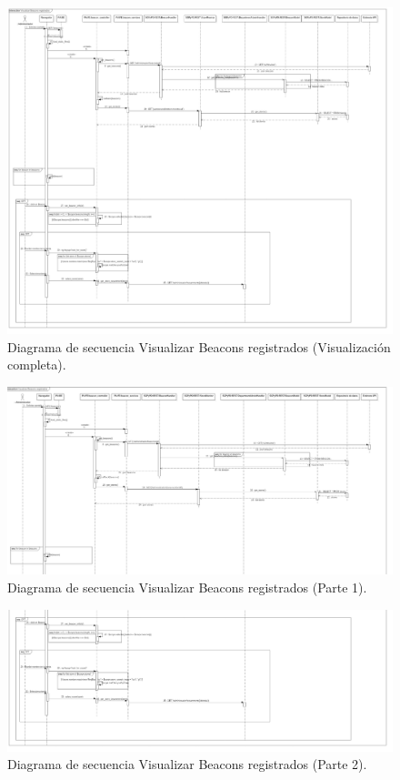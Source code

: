 \FloatBarrier
\begin{figure}[htbp!]
		\centering
			\includegraphics[width=1 \textwidth]{imagenes/DSRuben/beacons}
		\caption{Diagrama de secuencia Visualizar Beacons registrados (Visualización completa).}
		\label{PADS:VisualizarBeacon}
\end{figure}
\FloatBarrier

\FloatBarrier
\begin{figure}[htbp!]
		\centering
			\includegraphics[width=1 \textwidth]{imagenes/DSRuben/beacons1}
		\caption{Diagrama de secuencia Visualizar Beacons registrados (Parte 1).}
		\label{PADS:VisualizarBeacon1}
\end{figure}
\FloatBarrier

\FloatBarrier
\begin{figure}[htbp!]
		\centering
			\includegraphics[width=1 \textwidth]{imagenes/DSRuben/beacons2}
		\caption{Diagrama de secuencia Visualizar Beacons registrados (Parte 2).}
		\label{PADS:VisualizarBeacon2}
\end{figure}
\FloatBarrier

